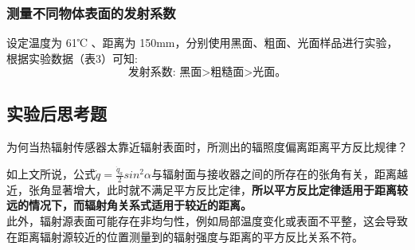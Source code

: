 \documentclass[dvipsnames, svgnames,a4paper,11pt]{article}
\begin{document}
	\subsubsection{测量不同物体表面的发射系数}
	设定温度为 61℃ 、距离为 150mm，分别使用黑面、粗面、光面样品进行实验，根据实验数据（表3）可知:
	$$\text{发射系数: 黑面>粗糙面>光面。}$$
	
	
	\subsection{实验后思考题}
	
	\begin{question}
		为何当热辐射传感器太靠近辐射表面时，所测出的辐照度偏离距离平方反比规律？
	\end{question}
	如上文所说，公式$\dot{q}=\frac{\dot{q}_a}2sin^2\alpha $与辐射面与接收器之间的所存在的张角有关，距离越近，张角显著增大，此时就不满足平方反比定律，\textbf{所以平方反比定律适用于距离较远的情况下，而辐射角关系式适用于较近的距离。}\\
	\indent 此外，辐射源表面可能存在非均匀性，例如局部温度变化或表面不平整，这会导致在距离辐射源较近的位置测量到的辐射强度与距离的平方反比关系不符。
	
\end{document}

